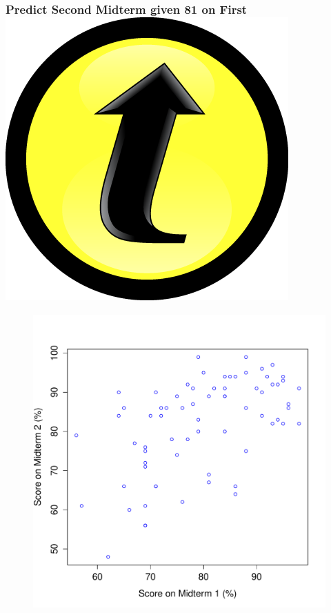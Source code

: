 \documentclass[handout]{beamer}
\begin{document}
\begin{frame}
\frametitle{Predict Second Midterm given 81 on First \hfill \includegraphics[scale = 0.05]{./images/clicker} }
\begin{figure}
	\includegraphics[scale = 0.48]{./images/midterms0}
\end{figure}
\end{frame}
\end{document}
